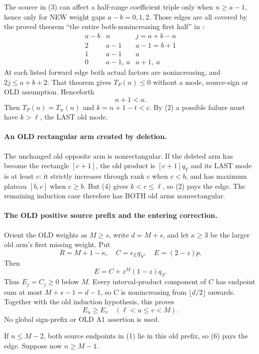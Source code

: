 \documentclass[11pt]{article}
\begin{document}
The source in (3) can affect a half-range coefficient triple only when
$n\ge a-1$, hence only for NEW weight gaps $a-b=0,1,2$.
Those edges are all covered by the proved theorem ``the entire
both-nonincreasing first half'' in
{\normalfont{}}:
\[
\begin{array}{c|c|c}
a-b&n&j=a+b-n\\\hline
2&a-1&a-1=b+1\\
1&a-1&a\\
0&a-1,\ a&a+1,\ a
\end{array}
\]
At each listed forward edge both actual factors are nonincreasing,
and $2j\le a+b+2$. That theorem gives $T_P(n)\le0$ without a mode,
source-sign or OLD assumption. Henceforth
\[
                              n+1<a.                   \tag{4}
\]
Then $T_P(n)=T_w(n)$ and $k=n+1-t<c$.
By (2) a possible failure must have $k>\ell$, the LAST old mode.

\paragraph{An OLD rectangular arm created by deletion.}
The unchanged old opposite arm is nonrectangular. If the deleted arm
has become the rectangle $[c+1]$, the old product is $[c+1]q_Y$ and
its LAST mode is at least $c$: it strictly increases through rank $c$
when $c<b$, and has maximum plateau $[b,c]$ when $c\ge b$.
But (4) gives $k<c\le\ell$, so (2) pays the edge.
The remaining induction case therefore has BOTH old arms nonrectangular.

\paragraph{The OLD positive source prefix and the entering correction.}
Orient the OLD weights as $M\ge s$, write $d=M+s$, and let
$\kappa\ge3$ be the larger old arm's first missing weight. Put
\[
 R=M+1-\kappa,\quad
 C=e_Lq_S,\quad E=(2-z)p.
\]
Then
\[
                         E=C+z^M(1-z)q_S.              \tag{5}
\]
Thus $E_j=C_j\ge0$ below $M$.
Every interval-product component of $C$ has endpoint sum at most
$M+s-1=d-1$, so $C$ is nonincreasing from $\lfloor d/2\rfloor$ onwards.
Together with the old induction hypothesis, this proves
\[
 E_u\ge E_v\quad(\ell<u\le v<M).                       \tag{6}
\]
No global sign-prefix or OLD A1 assertion is used.

If $n\le M-2$, both source endpoints in (1) lie in this old prefix,
so (6) pays the edge. Suppose now $n\ge M-1$.
\end{document}
